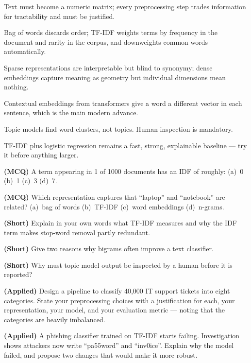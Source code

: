 \begin{chaptersummary}
\begin{tight}
  \item Text must become a numeric matrix; every preprocessing step trades
        information for tractability and must be justified.
  \item Bag of words discards order; TF-IDF weights terms by frequency in the
        document and rarity in the corpus, and downweights common words
        automatically.
  \item Sparse representations are interpretable but blind to synonymy; dense
        embeddings capture meaning as geometry but individual dimensions mean
        nothing.
  \item Contextual embeddings from transformers give a word a different vector in
        each sentence, which is the main modern advance.
  \item Topic models find word clusters, not topics. Human inspection is mandatory.
  \item TF-IDF plus logistic regression remains a fast, strong, explainable baseline
        --- try it before anything larger.
\end{tight}
\end{chaptersummary}

\begin{reviewq}
  \item \textbf{(MCQ)} A term appearing in 1 of 1000 documents has an IDF of roughly:
        (a)~0 (b)~1 (c)~3 (d)~7.
  \item \textbf{(MCQ)} Which representation captures that ``laptop'' and ``notebook''
        are related? (a)~bag of words (b)~TF-IDF (c)~word embeddings (d)~n-grams.
  \item \textbf{(Short)} Explain in your own words what TF-IDF measures and why the
        IDF term makes stop-word removal partly redundant.
  \item \textbf{(Short)} Give two reasons why bigrams often improve a text classifier.
  \item \textbf{(Short)} Why must topic model output be inspected by a human before
        it is reported?
  \item \textbf{(Applied)} Design a pipeline to classify 40{,}000 IT support tickets
        into eight categories. State your preprocessing choices with a justification
        for each, your representation, your model, and your evaluation metric ---
        noting that the categories are heavily imbalanced.
  \item \textbf{(Applied)} A phishing classifier trained on TF-IDF starts failing.
        Investigation shows attackers now write ``pa55word'' and ``inv0ice''. Explain
        why the model failed, and propose two changes that would make it more robust.
\end{reviewq}
